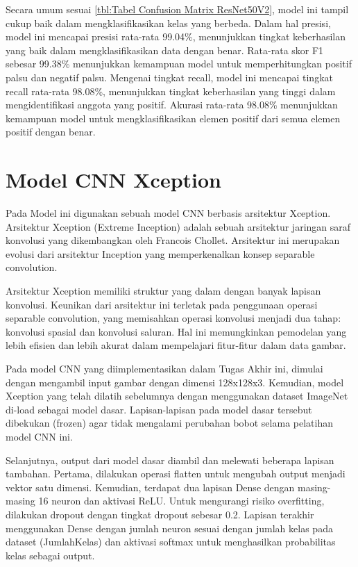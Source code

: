 Secara umum sesuai \ref{tbl:Tabel Confusion Matrix ResNet50V2}, model ini tampil cukup baik dalam mengklasifikasikan kelas yang berbeda. Dalam hal presisi, model ini mencapai presisi rata-rata 99.04\%, menunjukkan tingkat keberhasilan yang baik dalam mengklasifikasikan data dengan benar. Rata-rata skor F1 sebesar 99.38\% menunjukkan kemampuan model untuk memperhitungkan positif palsu dan negatif palsu. Mengenai tingkat recall, model ini mencapai tingkat recall rata-rata 98.08\%, menunjukkan tingkat keberhasilan yang tinggi dalam mengidentifikasi anggota yang positif. Akurasi rata-rata 98.08\% menunjukkan kemampuan model untuk mengklasifikasikan elemen positif dari semua elemen positif dengan benar. 


\section{Model CNN Xception}
Pada Model ini digunakan sebuah model CNN berbasis arsitektur Xception. Arsitektur Xception (Extreme Inception) adalah sebuah arsitektur jaringan saraf konvolusi yang dikembangkan oleh Francois Chollet. Arsitektur ini merupakan evolusi dari arsitektur Inception yang memperkenalkan konsep separable convolution.

Arsitektur Xception memiliki struktur yang dalam dengan banyak lapisan konvolusi. Keunikan dari arsitektur ini terletak pada penggunaan operasi separable convolution, yang memisahkan operasi konvolusi menjadi dua tahap: konvolusi spasial dan konvolusi saluran. Hal ini memungkinkan pemodelan yang lebih efisien dan lebih akurat dalam mempelajari fitur-fitur dalam data gambar.

Pada model CNN yang diimplementasikan dalam Tugas Akhir ini, dimulai dengan mengambil input gambar dengan dimensi 128x128x3. Kemudian, model Xception yang telah dilatih sebelumnya dengan menggunakan dataset ImageNet di-load sebagai model dasar. Lapisan-lapisan pada model dasar tersebut dibekukan (frozen) agar tidak mengalami perubahan bobot selama pelatihan model CNN ini.

Selanjutnya, output dari model dasar diambil dan melewati beberapa lapisan tambahan. Pertama, dilakukan operasi flatten untuk mengubah output menjadi vektor satu dimensi. Kemudian, terdapat dua lapisan Dense dengan masing-masing 16 neuron dan aktivasi ReLU. Untuk mengurangi risiko overfitting, dilakukan dropout dengan tingkat dropout sebesar 0.2. Lapisan terakhir menggunakan Dense dengan jumlah neuron sesuai dengan jumlah kelas pada dataset (JumlahKelas) dan aktivasi softmax untuk menghasilkan probabilitas kelas sebagai output.


